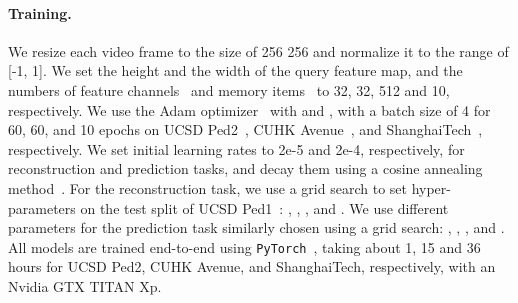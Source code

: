 \documentclass[10pt,twocolumn,letterpaper]{article}
\begin{document}
\vspace{-0.5cm}    
		\paragraph{Training.}
			We resize each video frame to the size of 256  256 and normalize it to the range of [-1, 1]. We set the height  and the width  of the query feature map, and the numbers of feature channels~ and memory items~ to 32, 32, 512 and 10, respectively. We use the Adam optimizer~\cite{kingma2014adam} with  and , with a batch size of 4 for 60, 60, and 10 epochs on UCSD Ped2~\cite{li2013anomaly}, CUHK Avenue~\cite{lu2013abnormal}, and ShanghaiTech~\cite{luo2017revisit}, respectively. We set initial learning rates to 2e-5 and 2e-4, respectively, for reconstruction and prediction tasks, and decay them using a cosine annealing method~\cite{loshchilov2016sgdr}. For the reconstruction task, we use a grid search to set hyper-parameters on the test split of UCSD Ped1~\cite{li2013anomaly}: , , ,  and . We use different parameters for the prediction task similarly chosen using a grid search: , , ,  and . All models are trained end-to-end using \texttt{PyTorch}~\cite{paszke2017automatic}, taking about 1, 15 and 36 hours for UCSD Ped2, CUHK Avenue, and ShanghaiTech, respectively, with an Nvidia GTX TITAN Xp.

	
\end{document}
